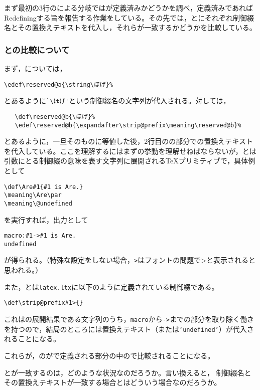 \documentclass[autodetect-engine,dvipdfmx]{jsarticle}
\begin{document}
まず最初の3行のによる分岐ではが定義済みかどうかを調べ，定義済みであればRedefiningする旨を報告する作業をしている。その先では，とにそれぞれ制御綴名とその置換えテキストを代入し，それらが一致するかどうかを比較している。

\subsubsection{との比較について}
まず，については，
\begin{lstlisting}
\edef\reserved@a{\string\ほげ}%
\end{lstlisting}
とあるように\preSub\verb|`\ほげ'|\preSub という制御綴名の文字列が代入される。対しては，
\begin{lstlisting}
   \def\reserved@b{\ほげ}%
   \edef\reserved@b{\expandafter\strip@prefix\meaning\reserved@b}%
\end{lstlisting}
とあるように，一旦そのものに等値した後，2行目のの部分での置換えテキストを代入している。ここを理解するにはまずの挙動を理解せねばならないが，とは引数にとる制御綴の意味を表す文字列に展開される\TeX プリミティブで，具体例として
\begin{lstlisting}
\def\Are#1{#1 is Are.}
\meaning\Are\par
\meaning\@undefined
\end{lstlisting}
を実行すれば，出力として
\begin{lstlisting}
macro:#1->#1 is Are.
undefined
\end{lstlisting}
が得られる。（特殊な設定をしない場合，\preSub\texttt{>}\preSub はフォントの問題で>と表示されると思われる。）

また，とは\texttt{latex.ltx}に以下のように定義されている制御綴である。
\begin{lstlisting}[firstnumber=129]
\def\strip@prefix#1>{}
\end{lstlisting}
これはの展開結果である文字列のうち，\texttt{macro}から\texttt{->}までの部分を取り除く働きを持つので，結局のところには置換えテキスト（または\texttt{`undefined'}）が代入されることになる。

これらが，のがで定義される部分の中ので比較されることになる。

\begin{question}
とが一致するのは，どのような状況なのだろうか。言い換えると，
制御綴名とその置換えテキストが一致する場合とはどういう場合なのだろうか。

\end{question}
\end{document}
